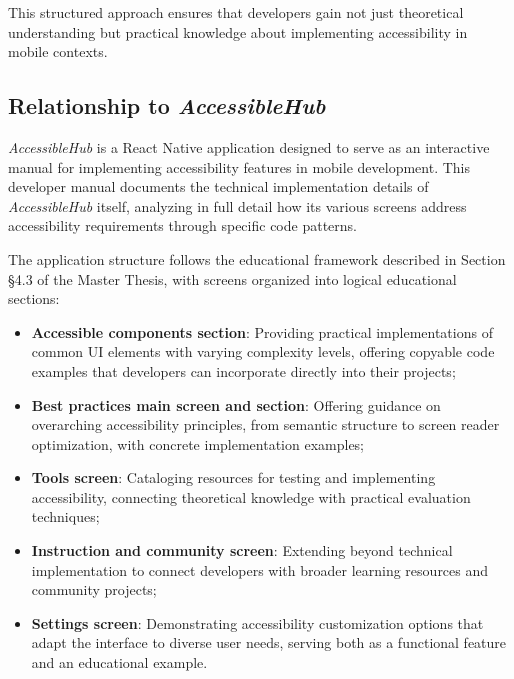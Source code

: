 This structured approach ensures that developers gain not just theoretical understanding but practical knowledge about implementing accessibility in mobile contexts.

\subsection{Relationship to \textit{AccessibleHub}}
\label{subsec:dev-relation}

\textit{AccessibleHub} is a React Native application designed to serve as an interactive manual for implementing accessibility features in mobile development. This developer manual documents the technical implementation details of \textit{AccessibleHub} itself, analyzing in full detail how its various screens address accessibility requirements through specific code patterns.

The application structure follows the educational framework described in Section §4.3 of the Master Thesis, with screens organized into logical educational sections:

\begin{itemize}
    \item \textbf{Accessible components section}: Providing practical implementations of common UI elements with varying complexity levels, offering copyable code examples that developers can incorporate directly into their projects;
    
    \item \textbf{Best practices main screen and section}: Offering guidance on overarching accessibility principles, from semantic structure to screen reader optimization, with concrete implementation examples;
    
    \item \textbf{Tools screen}: Cataloging resources for testing and implementing accessibility, connecting theoretical knowledge with practical evaluation techniques;
    
    \item \textbf{Instruction and community screen}: Extending beyond technical implementation to connect developers with broader learning resources and community projects;
    
    \item \textbf{Settings screen}: Demonstrating accessibility customization options that adapt the interface to diverse user needs, serving both as a functional feature and an educational example.
\end{itemize}

